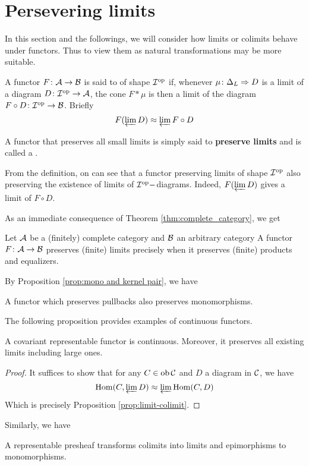 \newpage\section{Persevering limits}
  In this section and the followings, we will consider how limits or colimits behave under functors. Thus to view them as natural transformations may be more suitable.
  \begin{defn}
    A functor $F \colon {\cal A} \to {\cal B}$ is said to  of shape ${\cal I}^{\operatorname{op}}$ if, whenever $\mu\colon \Delta_L\Rightarrow D$ is a limit of a diagram $D\colon{\cal I}^{\operatorname{op}}\to{\cal A}$, the cone $F\ast \mu$ is then a limit of the diagram $F\circ D\colon{\cal I}^{\operatorname{op}}\to{\cal B}$. Briefly
    \begin{equation*}
      F(\operatorname*{\underleftarrow{\lim}} D) \approx \operatorname*{\underleftarrow{\lim}} F\circ D
    \end{equation*}

    A functor that preserves all small limits is simply said to \textbf{preserve limits} and is called a .
  \end{defn}
  \begin{rem}
    From the definition, on can see that a functor preserving limits of shape ${\cal I}^{\operatorname{op}}$ also preserving the existence of limits of ${\cal I}^{\operatorname{op}}-$diagrams. Indeed, $F(\operatorname*{\underleftarrow{\lim}} D)$ gives a limit of $F\circ D$.
  \end{rem}
    As an immediate consequence of Theorem \ref{thm:complete_category}, we get
  \begin{prop}
    Let ${\cal A}$ be a (finitely) complete category and ${\cal B}$ an arbitrary category A functor $F\colon{\cal A}\to{\cal B}$ preserves (finite) limits precisely when it preserves (finite) products and equalizers.
  \end{prop}
    By Proposition \ref{prop:mono and kernel pair}, we have
  \begin{prop}
    A functor which preserves pullbacks also preserves monomorphisms.
  \end{prop}

  The following proposition provides examples of continuous functors.
  \begin{prop}\label{prop:representable functor preserves limits}
    A covariant representable functor is continuous. Moreover, it preserves all existing limits including large ones.
  \end{prop}
  \begin{proof}
    It suffices to show that for any $C\in\operatorname{ob}{\cal C}$ and $D$ a diagram in ${\cal C}$, we have
    \begin{equation*}
      \operatorname{Hom}(C,\operatorname*{\underleftarrow{\lim}} D) \approx \operatorname*{\underleftarrow{\lim}} \operatorname{Hom}(C,D)
    \end{equation*}
    Which is precisely Proposition \ref{prop:limit-colimit}.
  \end{proof}
  Similarly, we have
  \begin{prop}
    A representable presheaf transforms colimits into limits and epimorphisms to monomorphisms.
  \end{prop}

